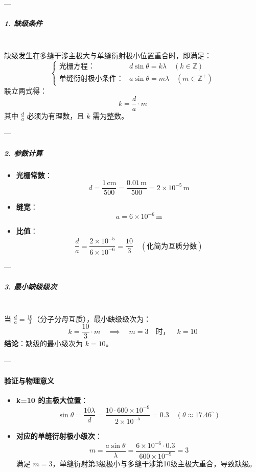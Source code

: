 \documentclass{article}
\begin{document}
{---

\subparagraph*{1. 缺级条件} \mbox{} \\

缺级发生在多缝干涉主极大与单缝衍射极小位置重合时，即满足：  
\[
\begin{cases}
\text{光栅方程：} & d \sin\theta = k\lambda \quad (k \in \mathbb{Z}) \\
\text{单缝衍射极小条件：} & a \sin\theta = m\lambda \quad (m \in \mathbb{Z}^+)
\end{cases}
\]  
联立两式得：  
\[
k = \frac{d}{a} \cdot m
\]  
其中 \( \frac{d}{a} \) 必须为有理数，且 \( k \) 需为整数。

---

\subparagraph*{2. 参数计算}

\begin{itemize}
    \item \textbf{光栅常数}：  
    \[
    d = \frac{1 \, \text{cm}}{500} = \frac{0.01 \, \text{m}}{500} = 2 \times 10^{-5} \, \text{m}
    \]  
    \item \textbf{缝宽}：  
    \[
    a = 6 \times 10^{-6} \, \text{m}
    \]  
    \item \textbf{比值}：  
    \[
    \frac{d}{a} = \frac{2 \times 10^{-5}}{6 \times 10^{-6}} = \frac{10}{3} \quad (\text{化简为互质分数})
    \]
\end{itemize}

---

\subparagraph*{3. 最小缺级级次} \mbox{} \\

当 \( \frac{d}{a} = \frac{10}{3} \)（分子分母互质），最小缺级级次为：  
\[
k = \frac{10}{3} \cdot m \quad \implies \quad m = 3 \quad \text{时，} \quad k = 10
\]  
\textbf{结论}：缺级的最小级次为 \( k = 10 \)。

---

\paragraph*{验证与物理意义}

\begin{itemize}
    \item \textbf{k=10 的主极大位置}：  
    \[
    \sin\theta = \frac{10 \lambda}{d} = \frac{10 \cdot 600 \times 10^{-9}}{2 \times 10^{-5}} = 0.3 \quad (\theta \approx 17.46^\circ)
    \]  
    \item \textbf{对应的单缝衍射极小级次}：  
    \[
    m = \frac{a \sin\theta}{\lambda} = \frac{6 \times 10^{-6} \cdot 0.3}{600 \times 10^{-9}} = 3
    \]  
    满足 \( m=3 \)，单缝衍射第3级极小与多缝干涉第10级主极大重合，导致缺级。
\end{itemize}

}
\end{document}
